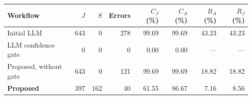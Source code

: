 \begin{tabular*}{\linewidth}{@{\extracolsep{\fill}}lrrrrrrr@{}}
\toprule
Workflow & $J$ & $S$ & Errors & $C_J$ (\%) & $C_A$ (\%) & $R_A$ (\%) & $R_J$ (\%) \\
\midrule
Initial LLM & 643 & 0 & 278 & 99.69 & 99.69 & 43.23 & 43.23 \\
LLM confidence gate & 0 & 0 & 0 & 0.00 & 0.00 & --- & --- \\
Proposed, without gate & 643 & 0 & 121 & 99.69 & 99.69 & 18.82 & 18.82 \\
\textbf{Proposed} & 397 & 162 & 40 & 61.55 & 86.67 & 7.16 & 8.56 \\
\bottomrule
\end{tabular*}
